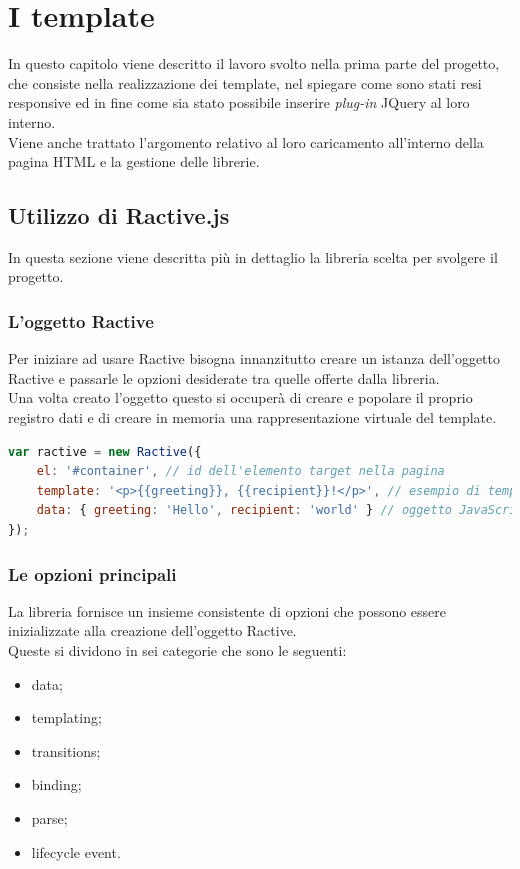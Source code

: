 
\chapter{I template}\label{cap:template}
In questo capitolo viene descritto il lavoro svolto nella prima parte del progetto, che consiste nella realizzazione dei template, nel spiegare come sono stati resi responsive ed in fine come sia stato possibile inserire \textit{plug-in} JQuery al loro interno.\\
Viene anche trattato l'argomento relativo al loro caricamento all'interno della pagina HTML e la gestione delle librerie.
\section{Utilizzo di Ractive.js}
In questa sezione viene descritta più in dettaglio la libreria scelta per svolgere il progetto.
\subsection{L'oggetto Ractive}
Per iniziare ad usare Ractive bisogna innanzitutto creare un istanza dell'oggetto Ractive e passarle le opzioni desiderate tra quelle offerte dalla libreria.\\
Una volta creato l'oggetto questo si occuperà di creare e popolare il proprio registro dati e di creare in memoria una rappresentazione virtuale del template.\\
\begin{lstlisting}[language=JavaScript, caption=Creazione di un oggetto Ractive.]
var ractive = new Ractive({
	el: '#container', // id dell'elemento target nella pagina
	template: '<p>{{greeting}}, {{recipient}}!</p>', // esempio di template
	data: { greeting: 'Hello', recipient: 'world' } // oggetto JavaScript contenente i dati
});
\end{lstlisting}

\newpage

\subsection{Le opzioni principali}
La libreria fornisce un insieme consistente di opzioni che possono essere inizializzate alla creazione dell'oggetto Ractive.\\
Queste si dividono in sei categorie che sono le seguenti:
\begin{itemize}
	\item data;
	\item templating;
	\item transitions;
	\item binding;
	\item parse;
	\item lifecycle event.
\end{itemize}

